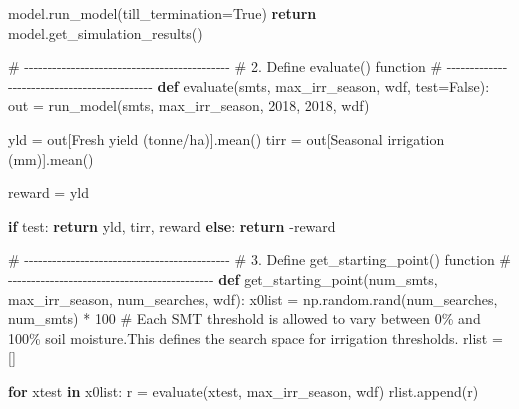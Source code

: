 \documentclass[
  letterpaper,
  DIV=11,
  numbers=noendperiod]{scrartcl}
\newenvironment{Shaded}{\begin{snugshade}}{\end{snugshade}}
\newcommand{\CommentTok}[1]{\textcolor[rgb]{0.37,0.37,0.37}{#1}}
\newcommand{\ControlFlowTok}[1]{\textcolor[rgb]{0.00,0.23,0.31}{\textbf{#1}}}
\newcommand{\DecValTok}[1]{\textcolor[rgb]{0.68,0.00,0.00}{#1}}
\newcommand{\KeywordTok}[1]{\textcolor[rgb]{0.00,0.23,0.31}{\textbf{#1}}}
\newcommand{\NormalTok}[1]{\textcolor[rgb]{0.00,0.23,0.31}{#1}}
\newcommand{\OperatorTok}[1]{\textcolor[rgb]{0.37,0.37,0.37}{#1}}
\newcommand{\StringTok}[1]{\textcolor[rgb]{0.13,0.47,0.30}{#1}}
\newcommand{\VariableTok}[1]{\textcolor[rgb]{0.07,0.07,0.07}{#1}}
\begin{document}
\begin{Shaded}
\begin{Highlighting}[]
\NormalTok{    model.run\_model(till\_termination}\OperatorTok{=}\VariableTok{True}\NormalTok{)}
    \ControlFlowTok{return}\NormalTok{ model.get\_simulation\_results()}

\CommentTok{\# {-}{-}{-}{-}{-}{-}{-}{-}{-}{-}{-}{-}{-}{-}{-}{-}{-}{-}{-}{-}{-}{-}{-}{-}{-}{-}{-}{-}{-}{-}{-}{-}{-}{-}{-}{-}{-}{-}{-}{-}{-}{-}{-}{-}}
\CommentTok{\# 2. Define evaluate() function}
\CommentTok{\# {-}{-}{-}{-}{-}{-}{-}{-}{-}{-}{-}{-}{-}{-}{-}{-}{-}{-}{-}{-}{-}{-}{-}{-}{-}{-}{-}{-}{-}{-}{-}{-}{-}{-}{-}{-}{-}{-}{-}{-}{-}{-}{-}{-}}
\KeywordTok{def}\NormalTok{ evaluate(smts, max\_irr\_season, wdf, test}\OperatorTok{=}\VariableTok{False}\NormalTok{):}
\NormalTok{    out }\OperatorTok{=}\NormalTok{ run\_model(smts, max\_irr\_season, }\DecValTok{2018}\NormalTok{, }\DecValTok{2018}\NormalTok{, wdf)}

\NormalTok{    yld }\OperatorTok{=}\NormalTok{ out[}\StringTok{\textquotesingle{}Fresh yield (tonne/ha)\textquotesingle{}}\NormalTok{].mean()}
\NormalTok{    tirr }\OperatorTok{=}\NormalTok{ out[}\StringTok{\textquotesingle{}Seasonal irrigation (mm)\textquotesingle{}}\NormalTok{].mean()}

\NormalTok{    reward }\OperatorTok{=}\NormalTok{ yld}

    \ControlFlowTok{if}\NormalTok{ test:}
        \ControlFlowTok{return}\NormalTok{ yld, tirr, reward}
    \ControlFlowTok{else}\NormalTok{:}
        \ControlFlowTok{return} \OperatorTok{{-}}\NormalTok{reward}

\CommentTok{\# {-}{-}{-}{-}{-}{-}{-}{-}{-}{-}{-}{-}{-}{-}{-}{-}{-}{-}{-}{-}{-}{-}{-}{-}{-}{-}{-}{-}{-}{-}{-}{-}{-}{-}{-}{-}{-}{-}{-}{-}{-}{-}{-}{-}}
\CommentTok{\# 3. Define get\_starting\_point() function}
\CommentTok{\# {-}{-}{-}{-}{-}{-}{-}{-}{-}{-}{-}{-}{-}{-}{-}{-}{-}{-}{-}{-}{-}{-}{-}{-}{-}{-}{-}{-}{-}{-}{-}{-}{-}{-}{-}{-}{-}{-}{-}{-}{-}{-}{-}{-}}
\KeywordTok{def}\NormalTok{ get\_starting\_point(num\_smts, max\_irr\_season, num\_searches, wdf):}
\NormalTok{    x0list }\OperatorTok{=}\NormalTok{ np.random.rand(num\_searches, num\_smts) }\OperatorTok{*} \DecValTok{100} \CommentTok{\# Each SMT threshold is allowed to vary between 0\% and 100\% soil moisture.This defines the search space for irrigation thresholds.}
\NormalTok{    rlist }\OperatorTok{=}\NormalTok{ []}

    \ControlFlowTok{for}\NormalTok{ xtest }\KeywordTok{in}\NormalTok{ x0list:}
\NormalTok{        r }\OperatorTok{=}\NormalTok{ evaluate(xtest, max\_irr\_season, wdf)}
\NormalTok{        rlist.append(r)}


\end{Highlighting}
\end{Shaded}
\end{document}
